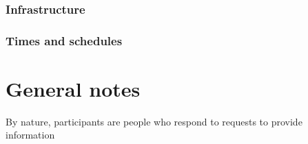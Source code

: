 \subsubsection{Infrastructure}\label{sec:resinfrastructure}
\subsubsection{Times and schedules}\label{sec:restimes}

\section{General notes}
By nature, participants are people who respond to requests to provide information


%
